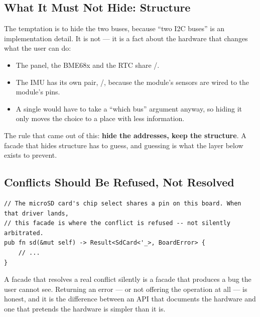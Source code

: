 \subsection{What It Must Not Hide: Structure}

The temptation is to hide the two buses, because ``two I2C buses'' is an implementation detail. It is
not — it is a fact about the hardware that changes what the user can do:

\begin{itemize}
    \item The panel, the BME68x and the RTC share /.
    \item The IMU has its own pair, /, because the module's sensors are
          wired to the module's pins.
    \item A single  would have to take a ``which bus'' argument anyway, so hiding it
          only moves the choice to a place with less information.
\end{itemize}

The rule that came out of this: \textbf{hide the addresses, keep the structure}. A facade that hides
structure has to guess, and guessing is what the layer below exists to prevent.

\subsection{Conflicts Should Be Refused, Not Resolved}

\begin{verbatim}
// The microSD card's chip select shares a pin on this board. When that driver lands,
// this facade is where the conflict is refused -- not silently arbitrated.
pub fn sd(&mut self) -> Result<SdCard<'_>, BoardError> {
    // ...
}
\end{verbatim}

A facade that resolves a real conflict silently is a facade that produces a bug the user cannot see.
Returning an error — or not offering the operation at all — is honest, and it is the difference between
an API that documents the hardware and one that pretends the hardware is simpler than it is.
